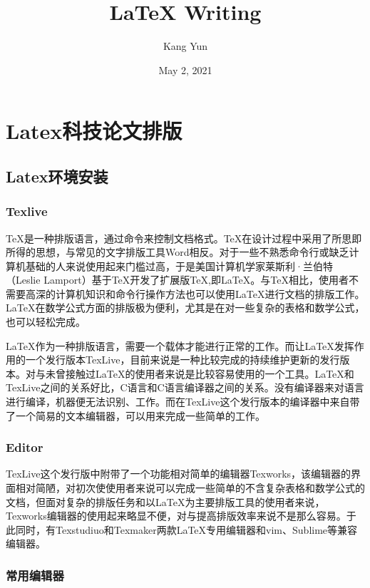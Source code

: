 \documentclass[12pt]{book}
\title{\LaTeX{} Writing}
\author{Kang Yun}
\date{May 2, 2021}
\begin{document}
\maketitle
\frontmatter

\tableofcontents

\part{Latex科技论文排版}

\chapter{Latex环境安装}

\section{Texlive}

\TeX{}是一种排版语言，通过命令来控制文档格式。\TeX{}在设计过程中采用了所思即所得的思想，与常见的文字排版工具Word相反。对于一些不熟悉命令行或缺乏计算机基础的人来说使用起来门槛过高，于是美国计算机学家莱斯利·兰伯特（Leslie Lamport）基于\TeX{}开发了扩展版\TeX{},即\LaTeX{}。与\TeX{}相比，使用者不需要高深的计算机知识和命令行操作方法也可以使用\LaTeX{}进行文档的排版工作。\LaTeX{}在数学公式方面的排版极为便利，尤其是在对一些复杂的表格和数学公式，也可以轻松完成。

\LaTeX{}作为一种排版语言，需要一个载体才能进行正常的工作。而让\LaTeX{}发挥作用的一个发行版本TexLive，目前来说是一种比较完成的持续维护更新的发行版本。对与未曾接触过\LaTeX{}的使用者来说是比较容易使用的一个工具。\LaTeX{}和TexLive之间的关系好比，C语言和C语言编译器之间的关系。没有编译器来对语言进行编译，机器便无法识别、工作。而在TexLive这个发行版本的编译器中来自带了一个简易的文本编辑器，可以用来完成一些简单的工作。

\section{Editor}

TexLive这个发行版中附带了一个功能相对简单的编辑器Texworks，该编辑器的界面相对简陋，对初次使使用者来说可以完成一些简单的不含复杂表格和数学公式的文档，但面对复杂的排版任务和以\LaTeX{}为主要排版工具的使用者来说，Texworks编辑器的使用起来略显不便，对与提高排版效率来说不是那么容易。于此同时，有Texstudiuo和Texmaker两款\LaTeX{}专用编辑器和vim、Sublime等兼容编辑器。

\section{常用编辑器}
\end{document}
